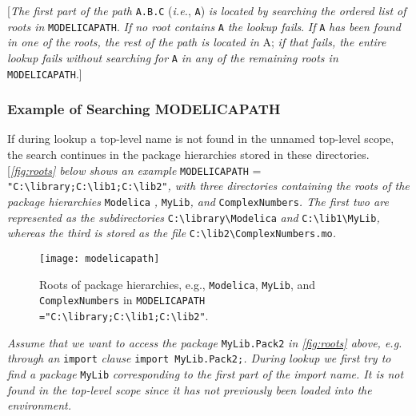 {[}\emph{The first part of the path} \lstinline[basicstyle=\ttfamily]!A.B.C! (\emph{i.e.}, \lstinline[basicstyle=\ttfamily]!A!) \emph{is
located by searching the ordered list of roots in} \lstinline[basicstyle=\ttfamily]!MODELICAPATH!.
\emph{If no root contains} \lstinline[basicstyle=\ttfamily]!A! \emph{the lookup fails}. \emph{If} \lstinline[basicstyle=\ttfamily]!A!
\emph{has been found in one of the roots, the rest of the path is
located in} A; \emph{if that fails, the entire lookup fails without
searching} \emph{for} \lstinline[basicstyle=\ttfamily]!A! \emph{in any of the remaining roots in}
\lstinline[basicstyle=\ttfamily]!MODELICAPATH!.{]}

\subsubsection{Example of Searching MODELICAPATH}

If during lookup a top-level name is not found in the unnamed top-level
scope, the search continues in the package hierarchies stored in these
directories. {[}\emph{\autoref{fig:roots} below shows an example} \lstinline[basicstyle=\ttfamily]!MODELICAPATH! =
\lstinline[basicstyle=\ttfamily]!"C:\library;C:\lib1;C:\lib2"!\emph{,
with three directories containing the roots of the package hierarchies}
\lstinline[basicstyle=\ttfamily]!Modelica! \emph{,} \lstinline[basicstyle=\ttfamily]!MyLib!\emph{, and} \lstinline[basicstyle=\ttfamily]!ComplexNumbers!\emph{. The first two are represented as the subdirectories} \lstinline[basicstyle=\ttfamily]!C:\library\Modelica! \emph{and}
\lstinline[basicstyle=\ttfamily]!C:\lib1\MyLib!\emph{, whereas the third is stored
as the file} \lstinline[basicstyle=\ttfamily]!C:\lib2\ComplexNumbers.mo!\emph{.}

\begin{figure}[H]
\caption{Roots of package hierarchies, e.g.,
\texttt{Modelica}, \texttt{MyLib}, and \texttt{ComplexNumbers} in
\texttt{MODELICAPATH ="C:\textbackslash library;C:\textbackslash lib1;C:\textbackslash lib2"}.}
\label{fig:roots}
\texttt{[image: modelicapath]}
\end{figure}

\emph{Assume that we want to access the package} \lstinline[basicstyle=\ttfamily]!MyLib.Pack2! \emph{in
\autoref{fig:roots} above, e.g. through an} \lstinline[basicstyle=\ttfamily]!import! \emph{clause} 
\lstinline[basicstyle=\ttfamily]!import MyLib.Pack2;!\emph{. During lookup we first try to find a package} \lstinline[basicstyle=\ttfamily]!MyLib!
\emph{corresponding to the first part of the import name. It is not
found in the top-level scope since it has not previously been loaded
into the environment. }

